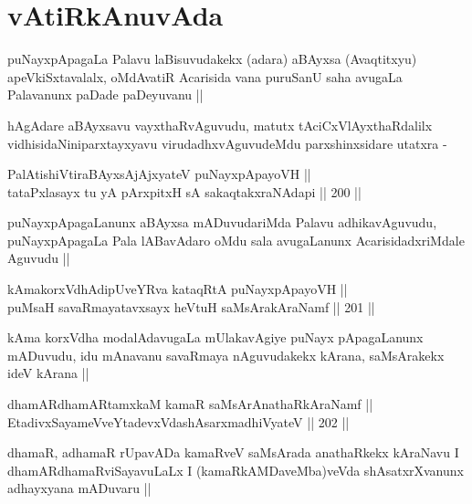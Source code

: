 \section*{vAtiRkAnuvAda}

\begin{artha}
puNayxpApagaLa Palavu laBisuvudakekx (adara) aBAyxsa (Avaqtitxyu)
apeVkiSxtavalalx, oMdAvatiR Acarisida vana puruSanU saha avugaLa
Palavanunx paDade paDeyuvanu ||
\end{artha}

\begin{artha}
hAgAdare aBAyxsavu vayxthaRvAguvudu, matutx tAciCxVlAyxthaRdalilx
vidhisidaNiniparxtayxyavu virudadhxvAguvudeMdu parxshinxsidare utatxra -
\end{artha}

\begin{shl}
PalAtishiVtiraBAyxsAjAjxyateV puNayxpApayoVH || \\
tataPxlasayx tu yA pArxpitxH sA sakaqtakxraNAdapi ||  200 ||  
\end{shl}

\begin{artha}
puNayxpApagaLanunx aBAyxsa mADuvudariMda Palavu adhikavAguvudu,
puNayxpApagaLa Pala lABavAdaro oMdu sala avugaLanunx
AcarisidadxriMdale Aguvudu ||
\end{artha}


\begin{shl}
kAmakorxVdhAdipUveYRva kataqRtA puNayxpApayoVH || \\
puMsaH savaRmayatavxsayx heVtuH saMsArakAraNamf ||  201 ||  
\end{shl}

\begin{artha}
kAma korxVdha modalAdavugaLa mUlakavAgiye puNayx pApagaLanunx
mADuvudu, idu mAnavanu savaRmaya nAguvudakekx kArana, saMsArakekx ideV
kArana ||
\end{artha}


\begin{shl}
dhamARdhamARtamxkaM kamaR saMsArAnathaRkAraNamf || \\
EtadivxSayameVveYtadevxVdashAsarxmadhiVyateV ||  202 ||  
\end{shl}

\begin{artha}
dhamaR, adhamaR rUpavADa kamaRveV saMsArada anathaRkekx kAraNavu I
dhamARdhamaRviSayavuLaLx I (kamaRkAMDaveMba)veVda shAsatxrXvanunx
adhayxyana mADuvaru ||
\end{artha}

